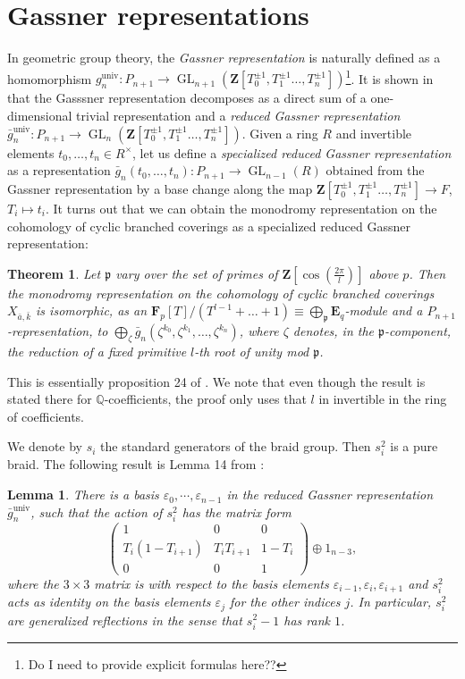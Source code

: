 \documentclass{article}
\newtheorem{theorem}{Theorem}
\newtheorem{lemma}{Lemma}
\theoremstyle{definition}
\DeclareMathOperator{\GL}{\mathrm{GL}}
\begin{document}
	\section{Gassner representations} \label{gassnerbasic}
	In geometric group theory, the \emph{Gassner representation} is naturally defined as a homomorphism $g^{\mathrm{univ}}_n : P_{n+1} \to \GL_{n+1}(\mathbf{Z}[T_0^{\pm 1}, T_1^{\pm 1}\ldots, T_n^{\pm 1}])$\footnote{Do I need to provide explicit formulas here??}. It is shown in \cite[section 3.5]{cyclic} that the Gasssner representation decomposes as a direct sum of a one-dimensional trivial representation and a \emph{reduced Gassner representation} $\bar{g}_n^{\mathrm{univ}} : P_{n+1} \to \GL_n(\mathbf{Z}[T_0^{\pm 1}, T_1^{\pm 1}\ldots, T_n^{\pm 1}])$. Given a ring $R$ and invertible elements $t_0, \ldots, t_n \in R^{\times}$, let us define a \emph{specialized reduced Gassner representation} as a representation $\bar{g}_n(t_0, \ldots, t_n) : P_{n+1} \to \GL_{n-1}(R)$ obtained from the Gassner representation by a base change along the map $\mathbf{Z}[T_0^{\pm 1}, T_1^{\pm 1}\ldots, T_n^{\pm 1}] \to F$, $T_i \mapsto t_i$. It turns out that we can obtain the monodromy representation on the cohomology of cyclic branched coverings as a specialized reduced Gassner representation: 
	\begin{theorem} 
		Let $\mathfrak{p}$ vary over the set of primes of $\mathbf{Z}[\cos(\frac{2\pi}{l})]$ above $p$. Then the monodromy representation on the cohomology of cyclic branched coverings $X_{\bar{a}, \bar{k}}$ is isomorphic, as an $\mathbf{F}_p[T]/(T^{l-1} + \ldots + 1) \equiv \bigoplus_{\mathfrak{p}} \mathbf{E}_q$-module and a $P_{n+1}$-representation, to $\bigoplus_{\zeta }\bar{g}_n(\zeta^{k_0}, \zeta^{k_1}, \ldots, \zeta^{k_n})$, where $\zeta$ denotes, in the $\mathfrak{p}$-component, the reduction of a fixed primitive $l$-th root of unity mod $\mathfrak{p}$.
	\end{theorem}
	This is essentially proposition 24 of \cite{cyclic}. We note that even though the result is stated there for $\mathbb{Q}$-coefficients, the proof only uses that $l$ in invertible in the ring of coefficients. \par 
	We denote by $s_i$ the standard generators of the braid group. Then $s_i^2$ is a pure braid. The following result is Lemma 14 from \cite{cyclic}:
	\begin{lemma} \label{explicit}There is a basis  $\varepsilon_0, \cdots,  \varepsilon_{n-1}$ in the reduced Gassner representation $\bar{g}_n^{\mathrm{univ}}$, such that the action of  $s_i^2$ has the matrix form
		\[\begin{pmatrix} 1 & 0 & 0 \\ T_i (1-T_{i+1}) & T_iT_{i+1} & 1-T_i \\ 0
			& 0 & 1 \end{pmatrix} \oplus 1_{n-3} , \] where the $3\times 3$ matrix
		is with respect  to the basis elements $\varepsilon_{i-1},  \varepsilon_i, \varepsilon_{i+1}$ and
		$s_i^2$ acts as identity on the basis elements $\varepsilon_j$ for the
		other indices $j$. In particular, $s_i^2$ are \emph{generalized reflections} in the sense that $s_i^2-1$ has rank $1$.
	\end{lemma}
\end{document}
